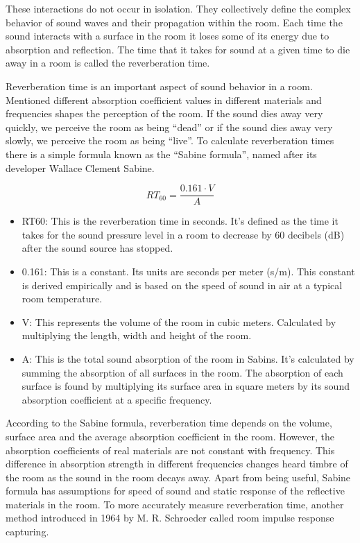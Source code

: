             These interactions do not occur in isolation. They collectively define the complex behavior of sound waves and their propagation within the room. Each time the sound interacts with a surface in the room it loses some of its energy due to absorption and reflection. The time that it takes for sound at a given time to die away in a room is called the reverberation time.\par

            Reverberation time is an important aspect of sound behavior in a room. Mentioned different absorption coefficient values in different materials and frequencies shapes the perception of the room. If the sound dies away very quickly, we perceive the room as being “dead” or if the sound dies away very slowly, we perceive the room as being “live”. To calculate reverberation times there is a simple formula known as the “Sabine formula”, named after its developer Wallace Clement Sabine\cite{Acoustics_and_Psychophysics}.\par 
            $$RT_{60} = \frac{0.161 \cdot V}{A}$$
            \begin{itemize}
                \item RT60: This is the reverberation time in seconds. It's defined as the time it takes for the sound pressure level in a room to decrease by 60 decibels (dB) after the sound source has stopped\cite{Room_Acoustics}.
                \item 0.161: This is a constant. Its units are seconds per meter (s/m). This constant is derived empirically and is based on the speed of sound in air at a typical room temperature.
                \item V: This represents the volume of the room in cubic meters. Calculated by multiplying the length, width and height of the room.
                \item A: This is the total sound absorption of the room in Sabins. It's calculated by summing the absorption of all surfaces in the room. The absorption of each surface is found by multiplying its surface area in square meters by its sound absorption coefficient at a specific frequency.
            \end{itemize}

            According to the Sabine formula, reverberation time depends on the volume, surface area and the average absorption coefficient in the room. However, the absorption coefficients of real materials are not constant with frequency. This difference in absorption strength in different frequencies changes heard timbre of the room as the sound in the room decays away. Apart from being useful, Sabine formula has assumptions for speed of sound and static response of the reflective materials in the room. To more accurately measure reverberation time, another method introduced in 1964 by M. R. Schroeder called room impulse response capturing\cite{New_Method_Measuring_RT}.\par

